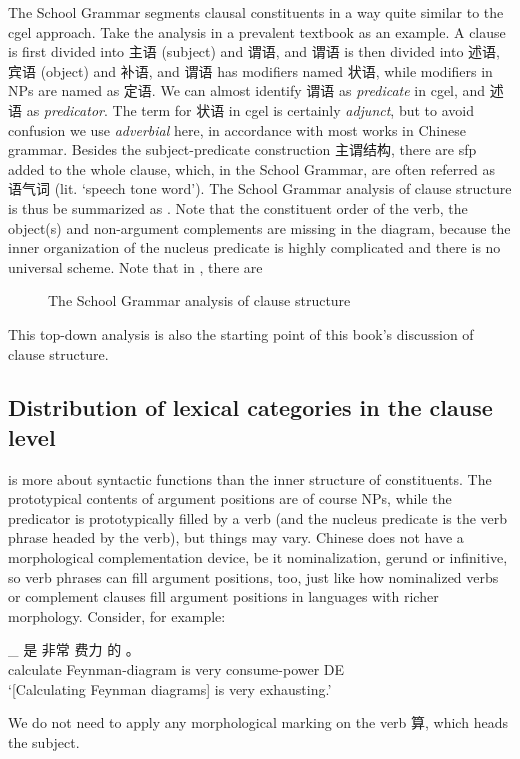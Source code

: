 \documentclass[../main.tex]{subfiles}
\begin{document}
The School Grammar segments clausal constituents in a way quite similar to the \ac{cgel} approach. 
Take the analysis in a prevalent textbook \citet[]{xianhan2004} as an example.
A clause is first divided into 主语 (subject) and 谓语, and 谓语 is then divided into 述语, 宾语 (object) and 补语,
and 谓语 has modifiers named 状语, while modifiers in NPs are named as 定语. We can almost identify 
谓语 as \emph{predicate} in \ac{cgel}, and 述语 as \emph{predicator}. 
The term for 状语 in \ac{cgel} is certainly \emph{adjunct}, but to avoid confusion we use \emph{adverbial}
here, in accordance with most works in Chinese grammar. 
Besides the subject-predicate construction 主谓结构, 
there are \ac{sfp} added to the whole clause, 
which, in the School Grammar, are often referred as 语气词 (lit. `speech tone word').
The School Grammar analysis of clause structure is thus 
be summarized as .
Note that the constituent order of the verb, 
the object(s) and non-argument complements are missing in the diagram, because 
the inner organization of the nucleus predicate is highly complicated and there is no universal scheme.
Note that in ,
there are %

\begin{figure}
    \centering
    
    \caption{The School Grammar analysis of clause structure}
    \label{fig:school-grammar-clause}
\end{figure}

This top-down analysis is 
also the starting point of this book's discussion of clause structure. 

\subsection{Distribution of lexical categories in the clause level}

 is more about syntactic functions than the inner structure of constituents.
The prototypical contents of argument positions are of course NPs, 
while the predicator is prototypically filled by a verb 
(and the nucleus predicate is the verb phrase headed by the verb), 
but things may vary.
Chinese does not have a morphological complementation device,
be it nominalization, gerund or infinitive, 
so verb phrases can fill argument positions, too, 
just like how nominalized verbs or complement clauses fill argument positions 
in languages with richer morphology. %
Consider, for example:
\begin{exe}
    \ex \gll [ 算 费曼-图 ]_{} 是 非常 费力 的 。\\
    {} calculate Feynman-diagram {} is very consume-power DE \\ %
    \glt `[Calculating Feynman diagrams] is very exhausting.'
\end{exe}
We do not need to apply any morphological marking on the verb 算, which heads the subject.
\end{document}

